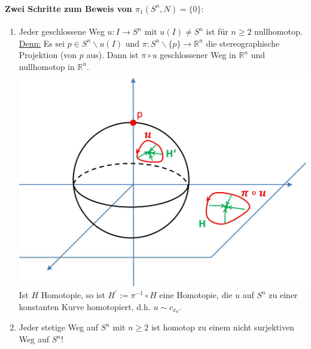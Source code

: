 \documentclass[a4paper,11pt,notitlepage]{report}
\newcommand{\R}{{\ensuremath{\mathbb{R}}}}
\begin{document}
\paragraph{Zwei Schritte zum Beweis von $\pi_1(S^n,N) = \{0\}:$}
\begin{enumerate}
	\item Jeder geschlossene Weg $u \colon I \rightarrow S^n$ mit $u(I) \neq S^n$ ist für $n \geq 2$ nullhomotop.
	\newline
	\underline{Denn:} Es sei $p \in S^n \backslash u(I)$ und $\pi \colon S^n \backslash \{p\} \rightarrow \R^n$ die stereographische Projektion (von $p$ aus). Dann ist $\pi \circ u$ geschlossener Weg in $\R^n$ und nullhomotop in $\R^n$. \newline \includegraphics[scale=0.4]{images/Weg_S2_nullhomotop.jpg}
	\newline
	Ist $H$ Homotopie, so ist $H^\prime := \pi^{-1} \circ H$ eine Homotopie, die $u$ auf $S^n$ zu einer konstanten Kurve homotopiert, d.h. $u \sim c_{x_0}$.
	
	\item Jeder stetige Weg auf $S^n$ mit $n\geq 2$ ist homotop zu einem nicht surjektiven Weg auf $S^n$!
\end{enumerate}
\end{document}

